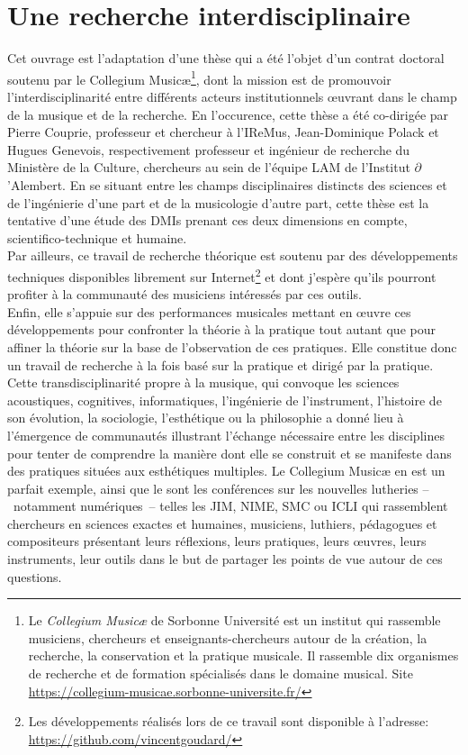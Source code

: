 \section{Une recherche interdisciplinaire}

\noindent Cet ouvrage est l'adaptation d'une thèse qui a été l'objet d'un contrat doctoral soutenu par le Collegium Musicæ\footnote{Le \textit{Collegium Musicæ} de Sorbonne Université est un institut qui rassemble musiciens, chercheurs et enseignants-chercheurs autour de la création, la recherche, la conservation et la pratique musicale. Il rassemble dix organismes de recherche et de formation spécialisés dans le domaine musical. Site \url{https://collegium-musicae.sorbonne-universite.fr/}}, dont la mission est de promouvoir l'interdisciplinarité entre différents acteurs institutionnels œuvrant dans le champ de la musique et de la recherche. En l'occurence, cette thèse a été co-dirigée par Pierre Couprie, professeur et chercheur à l'\gls{IReMus}, Jean-Dominique Polack et Hugues Genevois, respectivement professeur et ingénieur de recherche du Ministère de la Culture, chercheurs au sein de l'équipe \gls{LAM} de l'Institut $\partial$'Alembert. En se situant entre les champs disciplinaires distincts des sciences et de l'ingénierie d'une part et de la musicologie d'autre part, cette thèse est la tentative d'une étude des \glspl{DMI} prenant ces deux dimensions en compte, scientifico-technique et humaine.\\
\indent Par ailleurs, ce travail de recherche théorique est soutenu par des développements techniques disponibles librement sur Internet\footnote{Les développements réalisés lors de ce travail sont disponible à l'adresse: \url{https://github.com/vincentgoudard/}} et dont j'espère qu'ils pourront profiter à la communauté des musiciens intéressés par ces outils.\\
\indent Enfin, elle s'appuie sur des performances musicales mettant en œuvre ces développements pour confronter la théorie à la pratique tout autant que pour affiner la théorie sur la base de l'observation de ces pratiques. Elle constitue donc un travail de recherche à la fois basé sur la pratique et dirigé par la pratique.\\
\indent Cette transdisciplinarité propre à la musique, qui convoque les sciences acoustiques, cognitives, informatiques, l'ingénierie de l'instrument, l'histoire de son évolution, la sociologie, l'esthétique ou la philosophie a donné lieu à l'émergence de communautés illustrant l'échange nécessaire entre les disciplines pour tenter de comprendre la manière dont elle se construit et se manifeste dans des pratiques situées aux esthétiques multiples. Le Collegium Musicæ en est un parfait exemple, ainsi que le sont les conférences sur les nouvelles lutheries --~notamment numériques~-- telles les \gls{JIM}, \gls{NIME}, \gls{SMC} ou \gls{ICLI} qui rassemblent chercheurs en sciences exactes et humaines, musiciens, luthiers, pédagogues et compositeurs présentant leurs réflexions, leurs pratiques, leurs œuvres, leurs instruments, leur outils dans le but de partager les points de vue autour de ces questions.


